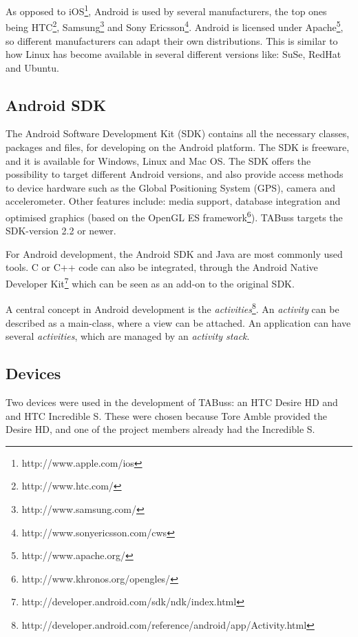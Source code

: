 As opposed to iOS\footnote{http://www.apple.com/ios}, Android is used by several manufacturers, the top ones being HTC\footnote{http://www.htc.com/}, Samsung\footnote{http://www.samsung.com/} and Sony Ericsson\footnote{http://www.sonyericsson.com/cws}. Android is licensed under Apache\footnote{http://www.apache.org/}, so different manufacturers can adapt their own distributions. This is similar to how Linux has become available in several different versions like: SuSe, RedHat and Ubuntu.

\subsection{Android SDK}
The Android Software Development Kit (SDK) contains all the necessary classes, packages and files, for developing on the Android platform. The SDK is freeware, and it is available for Windows, Linux and Mac OS. The SDK offers the possibility to target different Android versions, and also provide access methods to device hardware such as the Global Positioning System (GPS), camera and accelerometer. Other features include: media support, database integration and optimised graphics (based on the OpenGL ES framework\footnote{http://www.khronos.org/opengles/}). TABuss targets the SDK-version 2.2 or newer.

For Android development, the Android SDK and Java are most commonly used tools. C or C++ code can also be integrated, through the Android Native Developer Kit\footnote{http://developer.android.com/sdk/ndk/index.html} which can be seen as an add-on to the original SDK. 

A central concept in Android development is the \emph{activities}\footnote{http://developer.android.com/reference/android/app/Activity.html}. An \emph{activity} can be described as a main-class, where a view can be attached. An application can have several \emph{activities}, which are managed by an \emph{activity stack}.

\subsection{Devices}
Two devices were used in the development of TABuss: an HTC Desire HD and and HTC Incredible S. These were chosen because Tore Amble provided the Desire HD, and one of the project members already had the Incredible S. 

